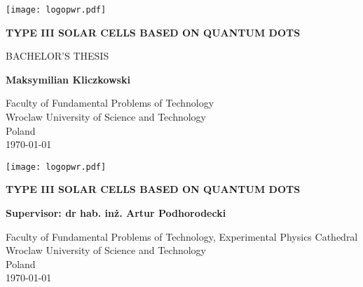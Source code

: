 \begin{titlepage}
   \begin{center}
       \vspace*{1cm}
       
	   \texttt{[image: logopwr.pdf]}
	   
	   \vspace*{5cm}
	   
       \textbf{\Huge TYPE III SOLAR CELLS \vspace{0.1cm} BASED ON QUANTUM DOTS}
       
       \vspace{1.5cm}
       
 	   \Large BACHELOR'S THESIS
 	   
       \vfill
       
	   \textbf{Maksymilian Kliczkowski}
       \vspace{0.8cm}
 
       
 
       \small Faculty of Fundamental Problems of Technology\\
       Wroclaw University of Science and Technology\\
       Poland\\
       \today
 
   \end{center}
\end{titlepage}

\newpage
 \begin{center}
       \vspace*{1cm}
       
	   \texttt{[image: logopwr.pdf]}
	   
	   \vspace*{5cm}
	   
       \textbf{\Huge TYPE III SOLAR CELLS \vspace{0.1cm} BASED ON QUANTUM DOTS}
       
       \vspace{1.5cm}
 	   
       
	   \Large \textbf{Supervisor: dr hab. inż. Artur Podhorodecki}
       \vspace{1.8cm}
 
       
 
       \small Faculty of Fundamental Problems of Technology, Experimental Physics Cathedral\\
       Wroclaw University of Science and Technology\\
       Poland\\
       \today
 
   \end{center}